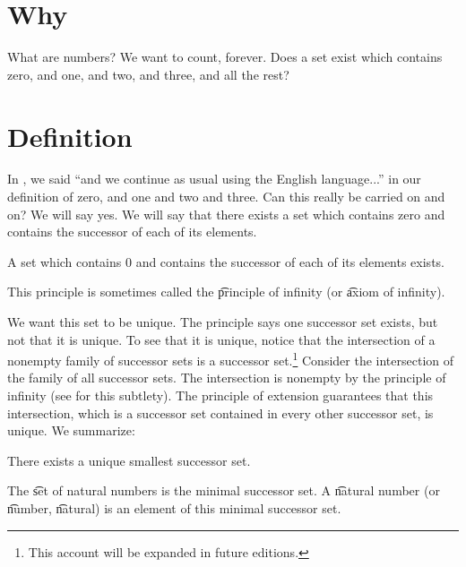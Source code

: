 

\section*{Why}

What are numbers?
We want to count, forever.
Does a set exist which contains zero, and one, and two, and three, and all the rest?

\section*{Definition}

In , we said ``and we continue as usual using the English language...'' in our definition of zero, and one and two and three.
Can this really be carried on and on?
We will say yes.
We will say that there exists a set which contains zero and contains the successor of each of its elements.

\begin{principle}
A set which contains 0 and contains the successor of each of its elements exists.\end{principle}
This principle is sometimes called the \t{principle of infinity} (or \t{axiom of infinity}).

We want this set to be unique.
The principle says one successor set exists, but not that it is unique.
To see that it is unique, notice that the intersection of a nonempty family of successor sets is a successor set.\footnote{This account will be expanded in future editions.}
Consider the intersection of the family of all successor sets.
The intersection is nonempty by the principle of infinity (see for this subtlety).
The principle of extension guarantees that this intersection, which is a successor set contained in every other successor set, is unique.
We summarize:

\begin{proposition}

\label{natural_numbers:proposition:omega}There exists a unique smallest successor set.\end{proposition}
The \t{set of natural numbers} is the minimal successor set.
A \t{natural number} (or \t{number}, \t{natural}) is an element of this minimal successor set.

